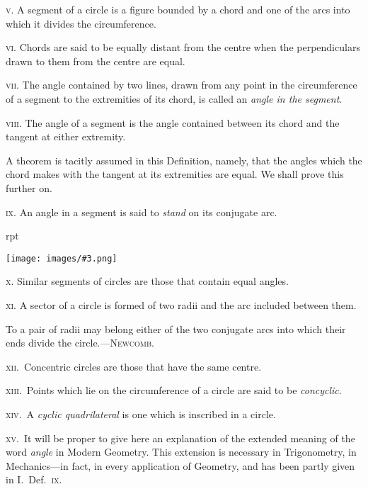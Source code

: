 \documentclass[oneside]{book}
\newcounter{wrapwidth}
\newcommand\imgflow[3]{
\setcounter{wrapwidth}{#1}
\begin{wrapfigure}[#2]{r}{\value{wrapwidth}pt}
\begin{center}
\vspace{-0.3in}
\texttt{[image: images/\#3.png]}
\end{center}
\end{wrapfigure}
}
\begin{document}
\textsc{v.} A segment of a circle is a figure bounded by a
chord and one of the arcs into which it divides the
circumference.

\textsc{vi.} Chords are said to be equally distant from the
centre when the perpendiculars drawn to them from
the centre are equal.

\textsc{vii.} The angle contained by two lines, drawn from
any point in the circumference of a segment to the
extremities of its chord, is called an \emph{angle in the segment}.

\textsc{viii.} The angle of a segment is the angle contained
between its chord and the tangent at either extremity.\par\smallskip

\begin{footnotesize}
A theorem is tacitly assumed in this Definition, namely, that
the angles which the chord makes with the tangent at its extremities
are equal. We shall prove this further on.
\par\end{footnotesize}\smallskip

\textsc{ix.} An angle in a segment is said to \emph{stand} on its
conjugate arc.

\imgflow{95}{6}{f102}

\textsc{x.} Similar segments of circles are
those that contain equal angles.

\textsc{xi.} A sector of a circle is formed
of two radii and the arc included
between them.\par\smallskip

\begin{footnotesize}
To a pair of radii may belong either of the two conjugate arcs
into which their ends divide the circle.---\textsc{Newcomb}.
\par\end{footnotesize}\smallskip


\textsc{xii}.\ Concentric circles are those that have the same
centre.

\textsc{xiii}.\ Points which lie on the circumference of a
circle are said to be \emph{concyclic}.

\textsc{xiv}.\ A \emph{cyclic quadrilateral} is one which is inscribed
in a circle.

\textsc{xv}.\ It will be proper to give here an explanation of
the extended meaning of the word \emph{angle} in Modern
Geometry. This extension is necessary in Trigonometry,
in Mechanics---in fact, in every application of
Geometry, and has been partly given in I.\ Def.\ \textsc{ix}.
\end{document}
